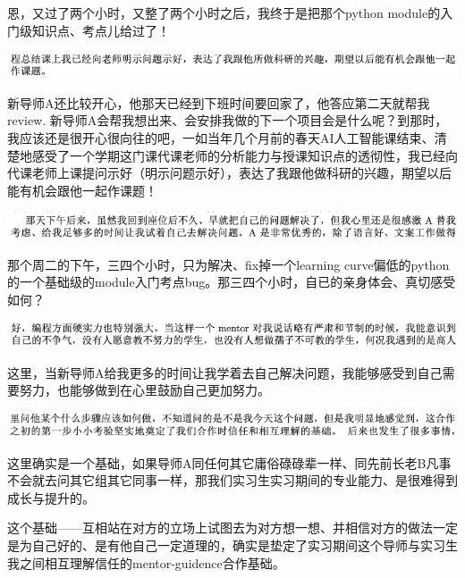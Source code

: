 \documentclass[9pt, b5paper]{article}
\begin{document}
恩，又过了两个小时，又整了两个小时之后，我终于是把那个python module的入门级知识点、考点儿给过了！

\begin{center}
\includegraphics[width=.9\linewidth]{./pic/backups_plans_20210511_110559.png}
\end{center}

新导师A还比较开心，他那天已经到下班时间要回家了，他答应第二天就帮我review. 新导师A会帮我想出来、会安排我做的下一个项目会是什么呢？到那时，我应该还是很开心很向往的吧，一如当年几个月前的春天AI人工智能课结束、清楚地感受了一个学期这门课代课老师的分析能力与授课知识点的透彻性，我已经向代课老师上课提问示好（明示问题示好），表达了我跟他做科研的兴趣，期望以后能有机会跟他一起作课题！

\begin{center}
\includegraphics[width=.9\linewidth]{./pic/backups_plans_20210511_114253.png}
\end{center}

那个周二的下午，三四个小时，只为解决、fix掉一个learning curve偏低的python的一个基础级的module入门考点bug。那三四个小时，自已的亲身体会、真切感受如何？

\begin{center}
\includegraphics[width=.9\linewidth]{./pic/backups_plans_20210511_114322.png}
\end{center}

这里，当新导师A给我更多的时间让我学着去自己解决问题，我能够感受到自己需要努力，也能够做到在心里鼓励自己更加努力。 

\begin{center}
\includegraphics[width=.9\linewidth]{./pic/backups_plans_20210511_114411.png}
\end{center}

这里确实是一个基础，如果导师A同任何其它庸俗碌碌辈一样、同先前长老B凡事不会就去问其它组其它同事一样，那我们实习生实习期间的专业能力、是很难得到成长与提升的。 

这个基础——互相站在对方的立场上试图去为对方想一想、并相信对方的做法一定是为自己好的、是有他自己一定道理的，确实是垫定了实习期间这个导师与实习生我之间相互理解信任的mentor-guidence合作基础。
\end{document}
